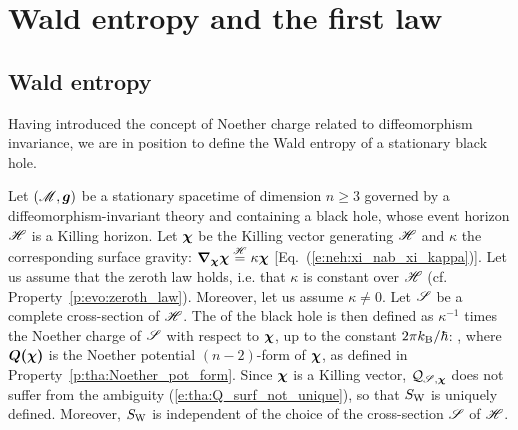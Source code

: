 
\section{Wald entropy and the first law}

\subsection{Wald entropy}

Having introduced the concept of Noether charge related to diffeomorphism invariance,
we are in position to define the Wald entropy of a stationary black hole.

\begin{prop}
Let $(\mathscr{M},\bm{g})$ be a stationary spacetime of dimension $n\geq 3$ governed
by a diffeomorphism-invariant theory and containing a black hole, whose
event horizon $\mathscr{H}$ is a Killing horizon. Let $\bm{\chi}$ be the Killing
vector generating $\mathscr{H}$ and $\kappa$ the corresponding surface gravity:
$\bm{\nabla}_{\bm{\chi}}\bm{\chi} \stackrel{\mathscr{H}}{=} \kappa \bm{\chi}$ [Eq.~(\ref{e:neh:xi_nab_xi_kappa})].
Let us assume that the zeroth law holds, i.e. that $\kappa$ is constant over $\mathscr{H}$
(cf. Property~\ref{p:evo:zeroth_law}). Moreover,  let us assume $\kappa \neq 0$.
Let $\mathscr{S}$ be a complete cross-section of $\mathscr{H}$.
The  of the black hole is
then defined as $\kappa^{-1}$ times
the Noether charge of $\mathscr{S}$ with respect to $\bm{\chi}$,
up to the constant $2\pi k_{\rm B}/\hbar$:
\be \label{e:tha:def_Wald_entropy}
     ,
\ee
where $\bm{Q}\textbf{(}\bm{\chi}\textbf{)}$ is the Noether potential $(n-2)$-form of $\bm{\chi}$,
as defined in Property~\ref{p:tha:Noether_pot_form}.
Since $\bm{\chi}$ is a Killing vector, $\mathcal{Q}_{\mathscr{S},\bm{\chi}}$ does not suffer from
the ambiguity (\ref{e:tha:Q_surf_not_unique}), so that $S_{\rm W}$ is uniquely defined.
Moreover, $S_{\rm W}$ is independent of the choice of the cross-section $\mathscr{S}$ of $\mathscr{H}$.
\end{prop}

